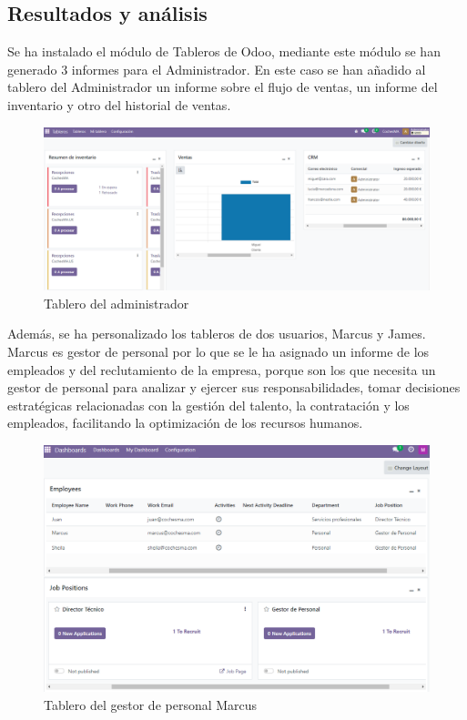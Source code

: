 \subsection{Resultados y análisis}
Se ha instalado el módulo de Tableros de Odoo, mediante este módulo se han generado 3 informes para el Administrador. En este caso se han añadido al tablero del Administrador un informe sobre el flujo de ventas, un informe del inventario y otro del historial de ventas. 
\begin{figure}[h]
    \centering
    \includegraphics[width=1\linewidth]{fotosDecisiones/admin.png}
    \caption{Tablero del administrador}
    \label{fig:enter-label}
\end{figure}
Además, se ha personalizado los tableros de dos usuarios, Marcus y James. Marcus es gestor de personal por lo que se le ha asignado un informe de los empleados y del reclutamiento de la empresa, porque son los que necesita un gestor de personal para analizar y ejercer sus responsabilidades, tomar decisiones estratégicas relacionadas con la gestión del talento, la contratación y los empleados, facilitando la optimización de los recursos humanos. 
\begin{figure}[h]
    \centering
    \includegraphics[width=0.9\linewidth]{fotosDecisiones/marcus.png}
    \caption{Tablero del gestor de personal Marcus}
    \label{fig:enter-label}
\end{figure}
